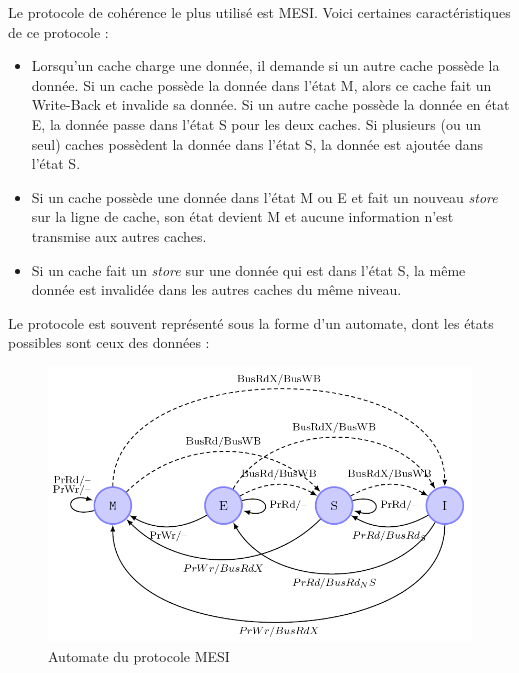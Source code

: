 Le protocole de cohérence le plus utilisé est MESI. Voici certaines caractéristiques de ce protocole : \\
\begin{itemize}
\item Lorsqu'un cache charge une donnée, il demande si un autre cache possède la donnée. Si un cache possède la donnée dans l'état M, alors ce cache fait un Write-Back et invalide sa donnée. Si un autre cache possède la donnée en état E, la donnée passe dans l'état S pour les deux caches. Si plusieurs (ou un seul) caches possèdent la donnée dans l'état S, la donnée est ajoutée dans l'état S.
\item Si un cache possède une donnée dans l'état M ou E et fait un nouveau \textit{store} sur la ligne de cache, son état devient M et aucune information n'est transmise aux autres caches.
\item Si un cache fait un \textit{store} sur une donnée qui est dans l'état S, la même donnée est invalidée dans les autres caches du même niveau. \\
\end{itemize}

Le protocole est souvent représenté sous la forme d'un automate, dont les états possibles sont ceux des données : \\

\begin{figure}[!h]
\begin{center}
   \includegraphics[scale=0.45]{images/mesi.png}
   \caption{\label{img:mesi} Automate du protocole MESI}
\end{center}
\end{figure}


